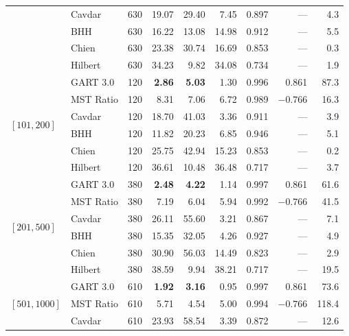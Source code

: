 \begin{table}[!ht]
{\begin{tabular}{@{}ll rrrrrrr@{}}
                             & Cavdar    & 630 & 19.07 & 29.40 & 7.45 & 0.897 & --- & 4.3 \\
                             & BHH       & 630 & 16.22 & 13.08 & 14.98 & 0.912 & --- & 5.5 \\
                             & Chien     & 630 & 23.38 & 30.74 & 16.69 & 0.853 & --- & 0.3 \\
                             & Hilbert   & 630 & 34.23 & 9.82 & 34.08 & 0.734 & --- & 1.9 \\ \midrule
\multirow{6}{*}{$[101,200]$} & GART 3.0  & 120 & \textbf{2.86} & \textbf{5.03} & 1.30 & 0.996 & 0.861 & 87.3 \\
                             & MST Ratio & 120 & 8.31 & 7.06 & 6.72 & 0.989 & $-0.766$ & 16.3 \\
                             & Cavdar    & 120 & 18.70 & 41.03 & 3.36 & 0.911 & --- & 3.9 \\
                             & BHH       & 120 & 11.82 & 20.23 & 6.85 & 0.946 & --- & 5.1 \\
                             & Chien     & 120 & 25.75 & 42.94 & 15.23 & 0.853 & --- & 0.2 \\
                             & Hilbert   & 120 & 36.61 & 10.48 & 36.48 & 0.717 & --- & 3.7 \\ \midrule
\multirow{6}{*}{$[201,500]$} & GART 3.0  & 380 & \textbf{2.48} & \textbf{4.22} & 1.14 & 0.997 & 0.861 & 61.6 \\
                             & MST Ratio & 380 & 7.19 & 6.04 & 5.94 & 0.992 & $-0.766$ & 41.5 \\
                             & Cavdar    & 380 & 26.11 & 55.60 & 3.21 & 0.867 & --- & 7.1 \\
                             & BHH       & 380 & 15.35 & 32.05 & 4.26 & 0.927 & --- & 4.9 \\
                             & Chien     & 380 & 30.90 & 56.03 & 14.49 & 0.823 & --- & 2.9 \\
                             & Hilbert   & 380 & 38.59 & 9.94 & 38.21 & 0.717 & --- & 19.5 \\ \midrule
\multirow{6}{*}{$[501,1000]$}& GART 3.0  & 610 & \textbf{1.92} & \textbf{3.16} & 0.95 & 0.997 & 0.861 & 73.6 \\
                             & MST Ratio & 610 & 5.71 & 4.54 & 5.00 & 0.994 & $-0.766$ & 118.4 \\
                             & Cavdar    & 610 & 23.93 & 58.54 & 3.39 & 0.872 & --- & 12.6 \\

\end{tabular}}
\end{table}
